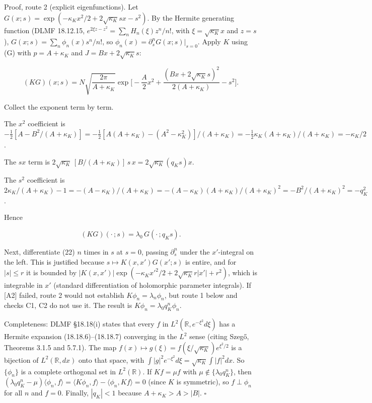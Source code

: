\documentclass[11pt,a4paper]{article}
\newcommand{\tagmark}[1]{\marginnote{\scriptsize\ttfamily #1}}
\newcommand{\Stag}[1]{\tagmark{[S] #1}}  %
\begin{document}
Proof, route 2 (explicit eigenfunctions). Let
\(G(x;s) = \exp(-\kappa_Kx^2/2 + 2\sqrt{\kappa_K}sx - s^2)\). \Stag{} By
the Hermite generating function (DLMF 18.12.15,
\(e^{2\xi z - z^2} = \sum_nH_n(\xi)z^n/n!\), with
\(\xi = \sqrt{\kappa_K}x\) and \(z = s\)),
\(G(x;s) = \sum_n\phi_n(x)s^n/n!\), so
\(\phi_n(x) = \partial_s^nG(x;s)|_{s=0}\). Apply \(K\) using (G) with
\(p = A+\kappa_K\) and \(J = Bx + 2\sqrt{\kappa_K}s\):

\[
(KG)(x;s) = N\sqrt{\frac{2\pi}{A+\kappa_K}}\exp\Big[-\frac A2x^2 + \frac{(Bx+2\sqrt{\kappa_K}s)^2}{2(A+\kappa_K)} - s^2\Big].
\]

Collect the exponent term by term.

The \(x^2\) coefficient is
\(-\tfrac12[A - B^2/(A+\kappa_K)] = -\tfrac12[A(A+\kappa_K) - (A^2-\kappa_K^2)]/(A+\kappa_K) = -\tfrac12\kappa_K(A+\kappa_K)/(A+\kappa_K) = -\kappa_K/2\).

The \(sx\) term is
\(2\sqrt{\kappa_K}\,[B/(A+\kappa_K)]\,s\,x = 2\sqrt{\kappa_K}(q_Ks)x\).

The \(s^2\) coefficient is
\(2\kappa_K/(A+\kappa_K) - 1 = -(A-\kappa_K)/(A+\kappa_K) = -(A-\kappa_K)(A+\kappa_K)/(A+\kappa_K)^2 = -B^2/(A+\kappa_K)^2 = -q_K^2\).

Hence

\[
(KG)(\cdot\,;s) = \lambda_0\,G(\cdot\,;q_Ks). \tag{22}
\]

\tagmark{[A2]} Next, differentiate (22) \(n\) times in \(s\) at \(s=0\),
passing \(\partial_s^n\) under the \(x'\)-integral on the left. This is
justified because \(s\mapsto K(x,x')G(x';s)\) is entire, and for
\(|s|\le r\) it is bounded by
\(|K(x,x')|\exp(-\kappa_Kx'^2/2 + 2\sqrt{\kappa_K}r|x'| + r^2)\), which
is integrable in \(x'\) (standard differentiation of holomorphic
parameter integrals). If {[}A2{]} failed, route 2 would not establish
\(K\phi_n = \lambda_n\phi_n\), but route 1 below and checks C1, C2 do
not use it. The result is \(K\phi_n = \lambda_0q_K^n\phi_n\).

Completeness: \Stag{} DLMF §18.18(i) states that every \(f\) in
\(L^2(\mathbb R, e^{-\xi^2}d\xi)\) has a Hermite expansion
(18.18.6)--(18.18.7) converging in the \(L^2\) sense (citing Szegő,
Theorems 3.1.5 and 5.7.1). The map
\(f(x)\mapsto g(\xi) = f(\xi/\sqrt{\kappa_K})e^{\xi^2/2}\) is a
bijection of \(L^2(\mathbb R,dx)\) onto that space, with
\(\int|g|^2e^{-\xi^2}d\xi = \sqrt{\kappa_K}\int|f|^2dx\). So
\(\{\phi_n\}\) is a complete orthogonal set in \(L^2(\mathbb R)\). If
\(Kf = \mu f\) with \(\mu\notin\{\lambda_0q_K^n\}\), then
\((\lambda_0q_K^n - \mu)\langle\phi_n,f\rangle = \langle K\phi_n,f\rangle - \langle\phi_n,Kf\rangle = 0\)
(since \(K\) is symmetric), so \(f\perp\phi_n\) for all \(n\) and
\(f = 0\). Finally, \(|q_K|<1\) because \(A+\kappa_K > A > |B|\).
\(\square\)
\end{document}
